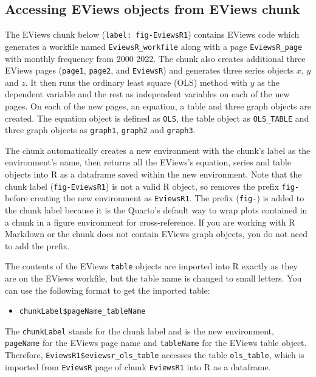 \hypertarget{accessing-eviews-objects-from-eviews-chunk}{%
\subsection{Accessing EViews objects from EViews chunk}\label{accessing-eviews-objects-from-eviews-chunk}}

The EViews chunk below (\texttt{label:\ fig-EviewsR1}) contains EViews code which generates a workfile named \texttt{EviewsR\_workfile} along with a page \texttt{EviewsR\_page} with monthly frequency from 2000 2022. The chunk also creates additional three EViews pages (\texttt{page1}, \texttt{page2}, and \texttt{EviewsR}) and generates three series objects \(x\), \(y\) and \(z\). It then runs the ordinary least square (OLS) method with \(y\) as the dependent variable and the rest as independent variables on each of the new pages. On each of the new pages, an equation, a table and three graph objects are created. The equation object is defined as \texttt{OLS}, the table object as \texttt{OLS\_TABLE} and three graph objects as \texttt{graph1}, \texttt{graph2} and \texttt{graph3}.

The chunk automatically creates a new environment with the chunk's label as the environment's name, then returns all the EViews's equation, series and table objects into R as a dataframe saved within the new environment. Note that the chunk label (\texttt{fig-EviewsR1}) is not a valid R object, so  removes the prefix \texttt{fig-} before creating the new environment as \texttt{EviewsR1}. The prefix (\texttt{fig-}) is added to the chunk label because it is the Quarto's default way to wrap plots contained in a chunk in a figure environment for cross-reference. If you are working with R Markdown or the chunk does not contain EViews graph objects, you do not need to add the prefix.

The contents of the EViews \texttt{table} objects are imported into R exactly as they are on the EViews workfile, but the table name is changed to small letters. You can use the following format to get the imported table:

\begin{itemize}
\tightlist
\item
  \texttt{chunkLabel\$pageName\_tableName}
\end{itemize}

The \texttt{chunkLabel} stands for the chunk label and is the new environment, \texttt{pageName} for the EViews page name and \texttt{tableName} for the EViews table object. Therefore, \texttt{EviewsR1\$eviewsr\_ols\_table} accesses the table \texttt{ols\_table}, which is imported from \texttt{EviewsR} page of chunk \texttt{EviewsR1} into R as a dataframe.

